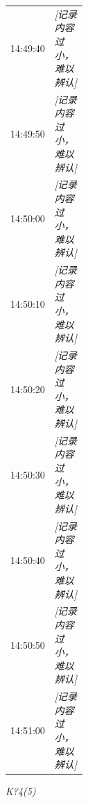 \documentclass[UTF8,10pt,a4paper,fontset=fandol]{ctexart}
\newcommand{\handwritten}[1]{#1}
\begin{document}
\begin{minipage}[t]{0.48\textwidth}
\begin{tabularx}{\linewidth}{|p{0.22\linewidth}|X|}
14:49:40 & \textit{[记录内容过小，难以辨认]} \\
14:49:50 & \textit{[记录内容过小，难以辨认]} \\
14:50:00 & \textit{[记录内容过小，难以辨认]} \\
14:50:10 & \textit{[记录内容过小，难以辨认]} \\
14:50:20 & \textit{[记录内容过小，难以辨认]} \\
14:50:30 & \textit{[记录内容过小，难以辨认]} \\
14:50:40 & \textit{[记录内容过小，难以辨认]} \\
14:50:50 & \textit{[记录内容过小，难以辨认]} \\
14:51:00 & \textit{[记录内容过小，难以辨认]} \\
\hline
\end{tabularx}

\handwritten{\textit{K?4(5)}}
\end{minipage}

\vspace{8mm}
\end{document}
